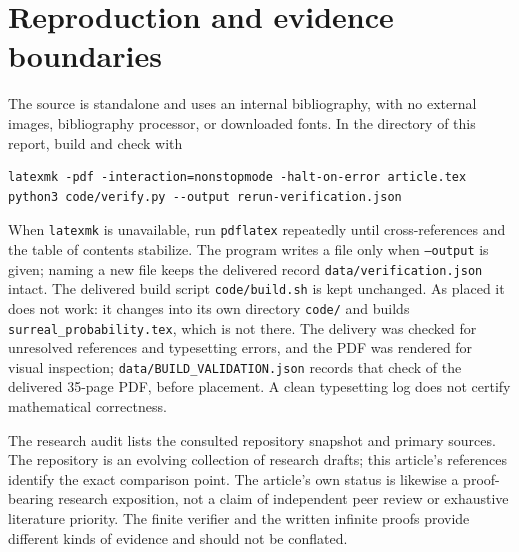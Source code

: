 \documentclass[11pt,a4paper]{article}
\numberwithin{equation}{section}
\theoremstyle{definition}
\theoremstyle{remark}
\begin{document}
\section{Reproduction and evidence boundaries}\label{fsp:app:build}

The source is standalone and uses an internal bibliography, with no
external images, bibliography processor, or downloaded fonts. In the
directory of this report, build and check with
\begin{verbatim}
latexmk -pdf -interaction=nonstopmode -halt-on-error article.tex
python3 code/verify.py --output rerun-verification.json
\end{verbatim}
When \texttt{latexmk} is unavailable, run \texttt{pdflatex} repeatedly
until cross-references and the table of contents stabilize. The program
writes a file only when \texttt{--output} is given; naming a new file keeps
the delivered record \texttt{data/verification.json} intact. The delivered
build script \texttt{code/build.sh} is kept unchanged. As placed it does not
work: it changes into its own directory \texttt{code/} and builds
\texttt{surreal\_probability.tex}, which is not there. The delivery was checked
for unresolved references and typesetting errors, and the PDF was rendered for
visual inspection; \texttt{data/BUILD\_VALIDATION.json} records that check of
the delivered 35-page PDF, before placement.
A clean typesetting log does not certify mathematical correctness.

The research audit lists the consulted repository snapshot and primary
sources. The repository is an evolving collection of research drafts;
this article's references identify the exact comparison point. The
article's own status is likewise a proof-bearing research exposition,
not a claim of independent peer review or exhaustive literature priority.
The finite verifier and the written infinite proofs provide different
kinds of evidence and should not be conflated.
\end{document}
